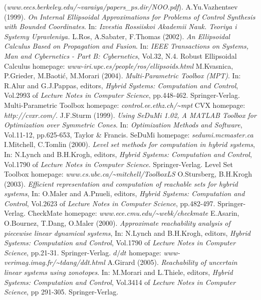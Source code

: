 \documentclass{report}
\begin{document}
\begin{thebibliography}{XX}
({\it www.eecs.berkeley.edu/\~{ }varaiya/papers\_ps.dir/NOO.pdf}).
 A.Yu.Vazhentsev (1999). {\it On Internal Ellipsoidal
Approximations for Problems of Control Synthesis with Bounded Coordinates}.
In: {\it Izvestia Rossiiskoi Akademii Nauk. Teoriya i Systemy Upravleniya.}
 L.Ros, A.Sabater, F.Thomas (2002).
{\it An Ellipsoidal Calculus Based on Propagation and Fusion}. In:
{\it IEEE Transactions on Systems, Man and Cybernetics - Part B: Cybernetics},
Vol.32, N.4.
 Robust Ellipsoidal Calculus homepage:
{\it www-iri.upc.es/people/ros/ellipsoids.html}
 M.Kvasnica, P.Grieder, M.Baoti\'{c}, M.Morari (2004).
{\it Multi-Parametric Toolbox (MPT)}. In: R.Alur and G.J.Pappas, editors,
{\it Hybrid Systems: Computation and Control}, Vol.2993 of
{\it Lecture Notes in Computer Science}, pp.448-462. Springer-Verlag.
 Multi-Parametric Toolbox homepage:
{\it control.ee.ethz.ch/\~{ }mpt}
 CVX homepage:
{\it http://cvxr.com/}.
 J.F.Sturm (1999). {\it Using SeDuMi 1.02, A MATLAB Toolbox
for Optimization over Symmetric Cones}. In: {\it Optimization Methods
and Software}, Vol.11-12, pp.625-653, Taylor \& Francis.
 SeDuMi homepage:
{\it sedumi.mcmaster.ca}
 I.Mitchell, C.Tomlin (2000). {\it Level set methods for
computation in hybrid systems}, In: N.Lynch and B.H.Krogh, editors,
{\it Hybrid Systems: Computation and Control}, Vol.1790 of
{\it Lecture Notes in Computer Science}. Springer-Verlag.
 Level Set Toolbox homepage:
{\it www.cs.ubc.ca/\~{ }mitchell/ToolboxLS}
 O.Stursberg, B.H.Krogh (2003). {\it Efficient representation
and computation of reachable sets for hybrid systems}, In: O.Maler and A.Pnueli,
editors, {\it Hybrid Systems: Computation and Control}, Vol.2623 of
{\it Lecture Notes in Computer Science}, pp.482-497. Springer-Verlag.
 CheckMate homepage:
{\it www.ece.cmu.edu/\~{ }webk/checkmate}
 E.Asarin, O.Bournez, T.Dang, O.Maler (2000). {\it Approximate
reachability analysis of piecewise linear dynamical systems},
In: N.Lynch and B.H.Krogh, editors,
{\it Hybrid Systems: Computation and Control}, Vol.1790 of
{\it Lecture Notes in Computer Science}, pp.21-31. Springer-Verlag.
 $d/dt$ homepage:
{\it www-verimag.imag.fr/\~{ }tdang/ddt.html}
 A.Girard (2005). {\it Reachability of uncertain linear
systems using zonotopes}. In: M.Morari and L.Thiele, editors,
{\it Hybrid Systems: Computation and Control}, Vol.3414 of
{\it Lecture Notes in Computer Science}, pp 291-305. Springer-Verlag.

\end{thebibliography}
\end{document}
